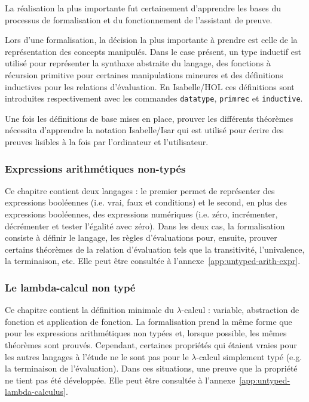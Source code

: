 \documentclass[a4paper, oneside, 12pt, titlepage]{article}
\begin{document}
La réalisation la plus importante fut certainement d'apprendre les bases du processus de
formalisation et du fonctionnement de l'assistant de preuve.

Lors d'une formalisation, la décision la plus importante à prendre est celle de la représentation
des concepts manipulés. Dans le case présent, un type inductif est utilisé pour représenter la
synthaxe abstraite du langage, des fonctions à récursion primitive pour certaines manipulations
mineures et des définitions inductives pour les relations d'évaluation. En Isabelle/HOL ces
définitions sont introduites respectivement avec les commandes \texttt{datatype}, \texttt{primrec}
et \texttt{inductive}.

Une fois les définitions de base mises en place, prouver les différents théorèmes nécessita
d'apprendre la notation Isabelle/Isar qui est utilisé pour écrire des preuves lisibles à la fois par
l'ordinateur et l'utilisateur.

\subsubsection{Expressions arithmétiques non-typés}

Ce chapitre contient deux langages : le premier permet de représenter des expressions booléennes
(i.e. vrai, faux et conditions) et le second, en plus des expressions booléennes, des expressions
numériques (i.e. zéro, incrémenter, décrémenter et tester l'égalité avec zéro). Dans les deux cas,
la formalisation consiste à définir le langage, les règles d'évaluations pour, ensuite, prouver
certains théorèmes de la relation d'évaluation tels que la transitivité, l'univalence, la
terminaison, etc. Elle peut être consultée à l'annexe~\ref{app:untyped-arith-expr}.

\subsubsection{Le lambda-calcul non typé}

Ce chapitre contient la définition minimale du $\lambda$-calcul : variable, abstraction de fonction
et application de fonction. La formalisation prend la même forme que pour les expressions
arithmétiques non typées et, lorsque possible, les mêmes théorèmes sont prouvés. Cependant,
certaines propriétés qui étaient vraies pour les autres langages à l'étude ne le sont pas pour le
$\lambda$-calcul simplement typé (e.g. la terminaison de l'évaluation). Dans ces situations, une
preuve que la propriété ne tient pas été développée. Elle peut être consultée à
l'annexe~\ref{app:untyped-lambda-calculus}.
\end{document}
